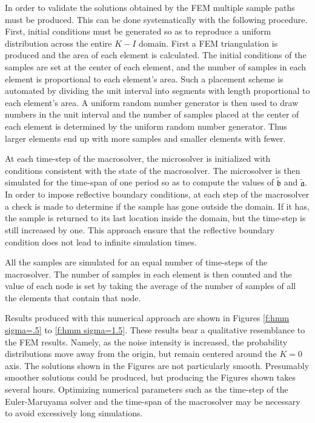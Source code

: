 In order to validate the solutions obtained by the FEM multiple sample paths must be produced. This can be done systematically with the following procedure. First, initial conditions must be generated so as to reproduce a uniform distribution across the entire $K-I$ domain. First a FEM triangulation is produced and the area of each element is calculated. The initial conditions of the samples are set at the center of each element, and the number of samples in each element is proportional to each element's area. Such a placement scheme is automated by dividing the unit interval into segments with length proportional to each element's area. A uniform random number generator is then used to draw numbers in the unit interval and the number of samples placed at the center of each element is determined by the uniform random number generator. Thus larger elements end up with more samples and smaller elements with fewer.

At each time-step of the macrosolver, the microsolver is initialized with conditions consistent with the state of the macrosolver. The microsolver is then simulated for the time-span of one period so as to compute the values of $\tilde{\mathfrak b}$ and $\tilde{\mathfrak a}$. In order to impose reflective boundary conditions, at each step of the macrosolver a check is made to determine if the sample has gone outside the domain. If it has, the sample is returned to its last location inside the domain, but the time-step is still increased by one. This approach ensure that the reflective boundary condition does not lead to infinite simulation times.


All the samples are simulated for an equal number of time-steps of the macrosolver. The number of samples in each element is then counted and the value of each node is set by taking the average of the number of samples of all the elements that contain that node.


Results produced with this numerical approach are shown in Figures \ref{f:hmm sigma=.5} to \ref{f:hmm sigma=1.5}. These results bear a qualitative resemblance to the FEM results. Namely, as the noise intensity is increased, the probability distributions move away from the origin, but remain centered around the $K=0$ axis. The solutions shown in the Figures are not particularly smooth. Presumably smoother solutions could be produced, but producing the Figures shown takes several hours. Optimizing numerical parameters such as the time-step of the Euler-Maruyama solver and the time-span of the macrosolver may be necessary to avoid excessively long simulations.

